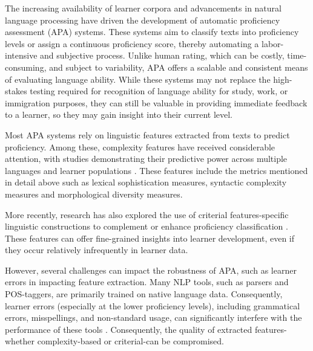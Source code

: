 
The increasing availability of learner corpora and advancements in natural language processing have driven the
development of automatic proficiency assessment (APA) systems. These systems aim to classify texts into proficiency
levels or assign a continuous proficiency score, thereby automating a labor-intensive and subjective process. Unlike
human rating, which can be costly, time-consuming, and subject to variability, APA offers a scalable and consistent
means of evaluating language ability. While these systems may not replace the
high-stakes testing required for recognition of language ability for study, work, or immigration purposes, they can
still be valuable in providing immediate feedback to a learner, so they may gain insight into their current level.

Most APA systems rely on linguistic features extracted from texts to predict proficiency. Among these, complexity
features have received considerable attention, with studies demonstrating their predictive power across multiple
languages and learner populations \citep{Lu2010,Ortega2003,Brezina2019,Jiang2019}. These features include the metrics
mentioned in detail above such as lexical sophistication measures, syntactic complexity measures and morphological
diversity measures.

More recently, research has also explored the use of criterial features-specific linguistic constructions to
complement or enhance proficiency classification
\citep{Hawkins_Buttery_2010,tono2013,tono2018,defino2022, Kim2021}. These features can offer fine-grained insights into
learner development, even if they occur relatively infrequently in learner data.


However, several challenges can impact the robustness of APA, such as learner errors in impacting feature extraction.
Many
NLP tools, such as parsers and POS-taggers, are primarily trained on native language data. Consequently, learner
errors (especially at the
lower proficiency levels), including grammatical
errors, misspellings, and non-standard usage, can
significantly interfere with the performance of these tools
\citep{Meurers_2015,Meurers2017}.
Consequently, the quality of extracted
features-whether complexity-based or criterial-can be compromised.

